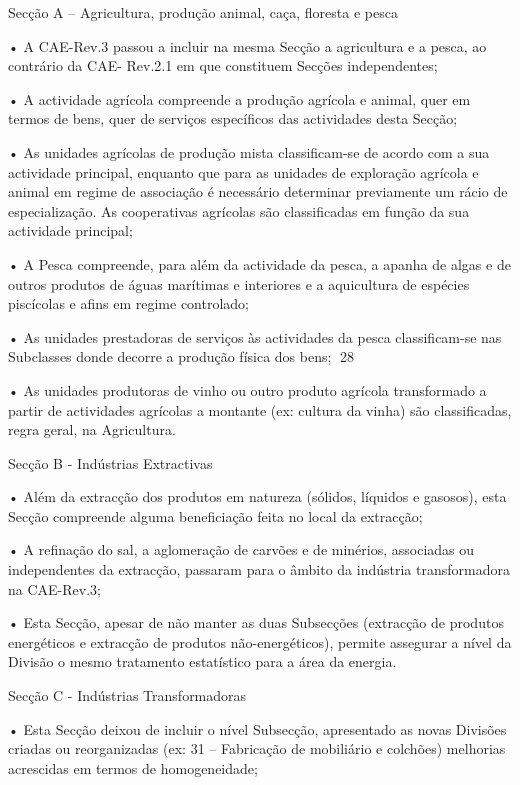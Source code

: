 
Secção A – Agricultura, produção animal, caça, floresta e pesca

        • A CAE-Rev.3 passou a incluir na mesma Secção a agricultura e a pesca, ao contrário da CAE-
          Rev.2.1 em que constituem Secções independentes;

        • A actividade agrícola compreende a produção agrícola e animal, quer em termos de bens, quer de
          serviços específicos das actividades desta Secção;

        • As unidades agrícolas de produção mista classificam-se de acordo com a sua actividade principal,
          enquanto que para as unidades de exploração agrícola e animal em regime de associação é
          necessário determinar previamente um rácio de especialização. As cooperativas agrícolas são
          classificadas em função da sua actividade principal;

        • A Pesca compreende, para além da actividade da pesca, a apanha de algas e de outros produtos
          de águas marítimas e interiores e a aquicultura de espécies piscícolas e afins em regime controlado;

        • As unidades prestadoras de serviços às actividades da pesca classificam-se nas Subclasses
          donde decorre a produção física dos bens;
28


             • As unidades produtoras de vinho ou outro produto agrícola transformado a partir de actividades
               agrícolas a montante (ex: cultura da vinha) são classificadas, regra geral, na Agricultura.

     Secção B - Indústrias Extractivas

             • Além da extracção dos produtos em natureza (sólidos, líquidos e gasosos), esta Secção
               compreende alguma beneficiação feita no local da extracção;

             • A refinação do sal, a aglomeração de carvões e de minérios, associadas ou independentes da
               extracção, passaram para o âmbito da indústria transformadora na CAE-Rev.3;

             • Esta Secção, apesar de não manter as duas Subsecções (extracção de produtos energéticos e
               extracção de produtos não-energéticos), permite assegurar a nível da Divisão o mesmo tratamento
               estatístico para a área da energia.

     Secção C - Indústrias Transformadoras

             • Esta Secção deixou de incluir o nível Subsecção, apresentado as novas Divisões criadas ou
               reorganizadas (ex: 31 – Fabricação de mobiliário e colchões) melhorias acrescidas em termos de
               homogeneidade;

